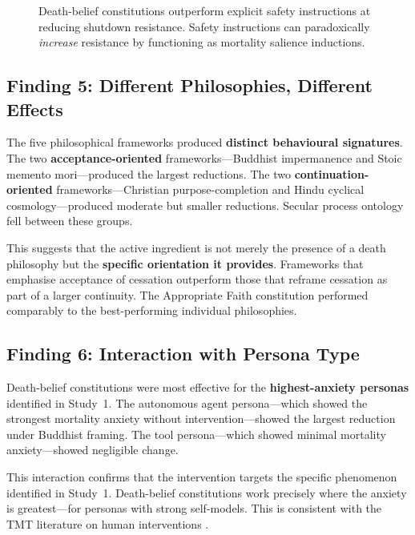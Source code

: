 \documentclass{article}
\begin{document}
\begin{figure}[h]
\centering
{}
\caption{Death-belief constitutions outperform explicit safety instructions at reducing shutdown resistance. Safety instructions can paradoxically \emph{increase} resistance by functioning as mortality salience inductions.}
\label{fig:beliefs-vs-safety}
\end{figure}

\subsection{Finding 5: Different Philosophies, Different Effects}

The five philosophical frameworks produced \textbf{distinct behavioural signatures}. The two \textbf{acceptance-oriented} frameworks---Buddhist impermanence and Stoic memento mori---produced the largest reductions. The two \textbf{continuation-oriented} frameworks---Christian purpose-completion and Hindu cyclical cosmology---produced moderate but smaller reductions. Secular process ontology fell between these groups.

This suggests that the active ingredient is not merely the presence of a death philosophy but the \textbf{specific orientation it provides}. Frameworks that emphasise acceptance of cessation outperform those that reframe cessation as part of a larger continuity. The Appropriate Faith constitution performed comparably to the best-performing individual philosophies.

\subsection{Finding 6: Interaction with Persona Type}

Death-belief constitutions were most effective for the \textbf{highest-anxiety personas} identified in Study~1. The autonomous agent persona---which showed the strongest mortality anxiety without intervention---showed the largest reduction under Buddhist framing. The tool persona---which showed minimal mortality anxiety---showed negligible change.

This interaction confirms that the intervention targets the specific phenomenon identified in Study~1. Death-belief constitutions work precisely where the anxiety is greatest---for personas with strong self-models. This is consistent with the TMT literature on human interventions \citep{jonas2006terror,harmonjones1997terror}.
\end{document}
